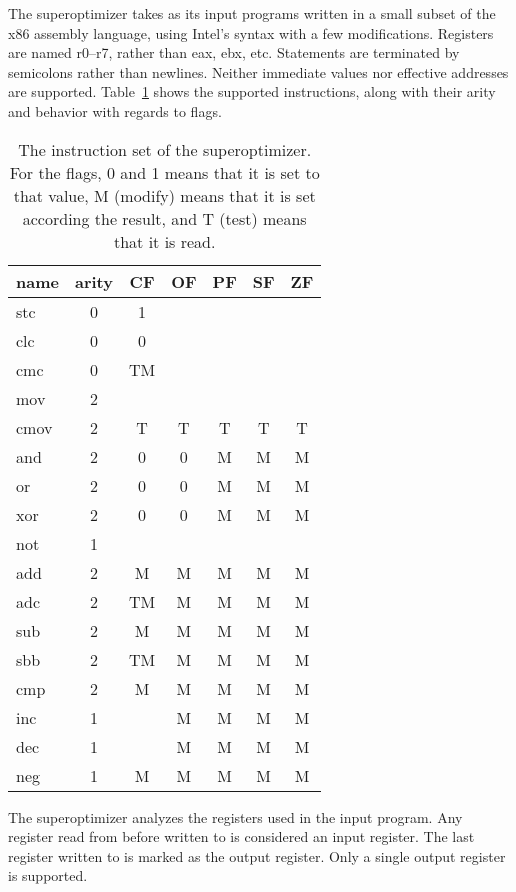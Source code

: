 \documentclass[a4paper,11pt]{kth-mag}
\begin{document}
The superoptimizer takes as its input programs written in a small subset of the x86 assembly language, using Intel's syntax with a few modifications.
Registers are named r0--r7, rather than eax, ebx, etc.
Statements are terminated by semicolons rather than newlines.
Neither immediate values nor effective addresses are supported.
Table~\ref{tab:insns} shows the supported instructions, along with their arity and behavior with regards to flags.

\begin{table}
\centering
\begin{tabular}{lc|ccccc}
name & arity & CF & OF & PF & SF & ZF \\
\hline
stc  & 0     & 1  &    &    &    &    \\
clc  & 0     & 0  &    &    &    &    \\
cmc  & 0     & TM &    &    &    &    \\
mov  & 2     &    &    &    &    &    \\
cmov & 2     & T  & T  & T  & T  & T  \\
and  & 2     & 0  & 0  & M  & M  & M  \\
or   & 2     & 0  & 0  & M  & M  & M  \\
xor  & 2     & 0  & 0  & M  & M  & M  \\
not  & 1     &    &    &    &    &    \\
add  & 2     & M  & M  & M  & M  & M  \\
adc  & 2     & TM & M  & M  & M  & M  \\
sub  & 2     & M  & M  & M  & M  & M  \\
sbb  & 2     & TM & M  & M  & M  & M  \\
cmp  & 2     & M  & M  & M  & M  & M  \\
inc  & 1     &    & M  & M  & M  & M  \\
dec  & 1     &    & M  & M  & M  & M  \\
neg  & 1     & M  & M  & M  & M  & M  \\
\end{tabular}
\caption{The instruction set of the superoptimizer.
For the flags, 0 and 1 means that it is set to that value, M (modify) means that it is set according the result, and T (test) means that it is read.}
\label{tab:insns}
\end{table}

The superoptimizer analyzes the registers used in the input program.
Any register read from before written to is considered an input register.
The last register written to is marked as the output register.
Only a single output register is supported.
\end{document}

